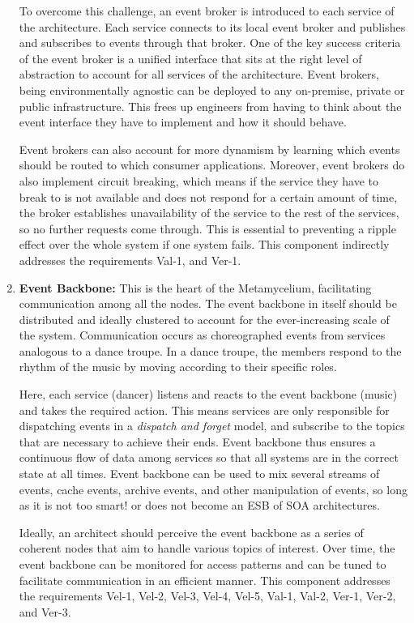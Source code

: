 \documentclass[preprint,12pt]{elsarticle}
\begin{document}
\begin{enumerate}
    To overcome this challenge, an event broker is introduced to each service of the architecture. Each service connects to its local event broker and publishes and subscribes to events through that broker. One of the key success criteria of the event broker is a unified interface that sits at the right level of abstraction to account for all services of the architecture. Event brokers, being environmentally agnostic can be deployed to any on-premise, private or public infrastructure. This frees up engineers from having to think about the event interface they have to implement and how it should behave. 
    
    Event brokers can also account for more dynamism by learning which events should be routed to which consumer applications.  Moreover, event brokers do also implement circuit breaking, which means if the service they have to break to is not available and does not respond for a certain amount of time, the broker establishes unavailability of the service to the rest of the services, so no further requests come through. This is essential to preventing a ripple effect over the whole system if one system fails. This component indirectly addresses the
    requirements Val-1, and Ver-1.

    \item \textbf{Event Backbone:} This is the heart of the Metamycelium, facilitating communication among all the nodes. The event backbone in itself should be distributed and ideally clustered to account for the ever-increasing scale of the system. Communication occurs as choreographed events from services analogous to a dance troupe. In a dance troupe, the members respond to the rhythm of the music by moving according to their specific roles.
    
    Here, each service (dancer) listens and reacts to the event backbone (music) and takes the required action. This means services are only responsible for dispatching events in a \emph{dispatch and forget} model, and subscribe to the topics that are necessary to achieve their ends. Event backbone thus ensures a continuous flow of data among services so that all systems are in the correct state at all times. Event backbone can be used to mix several streams of events, cache events, archive events, and other manipulation of events, so long as it is not too smart! or does not become an ESB of SOA architectures. 
    
    Ideally, an architect should perceive the event backbone as a series of coherent nodes that aim to handle various topics of interest. Over time, the event backbone can be monitored for access patterns and can be tuned to facilitate communication in an efficient manner. This component addresses the requirements Vel-1, Vel-2, Vel-3, Vel-4, Vel-5, Val-1, Val-2, Ver-1, Ver-2, and Ver-3.


\end{enumerate}
\end{document}

